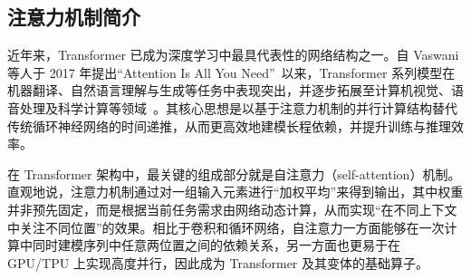 \subsection{注意力机制简介}

近年来，Transformer 已成为深度学习中最具代表性的网络结构之一。自 Vaswani 等人于 2017 年提出“Attention Is All You Need”~\cite{vaswani2017attention}以来，Transformer 系列模型在机器翻译、自然语言理解与生成等任务中表现突出，并逐步拓展至计算机视觉、语音处理及科学计算等领域~\cite{luong2015effective,dosovitskiy2020image,liu2021swin, calvello2024continuum}。其核心思想是以基于注意力机制的并行计算结构替代传统循环神经网络的时间递推，从而更高效地建模长程依赖，并提升训练与推理效率。

在 Transformer 架构中，最关键的组成部分就是自注意力（self-attention）机制。直观地说，注意力机制通过对一组输入元素进行“加权平均”来得到输出，其中权重并非预先固定，而是根据当前任务需求由网络动态计算，从而实现“在不同上下文中关注不同位置”的效果。相比于卷积和循环网络，自注意力一方面能够在一次计算中同时建模序列中任意两位置之间的依赖关系，另一方面也更易于在 GPU/TPU 上实现高度并行，因此成为 Transformer 及其变体的基础算子。



